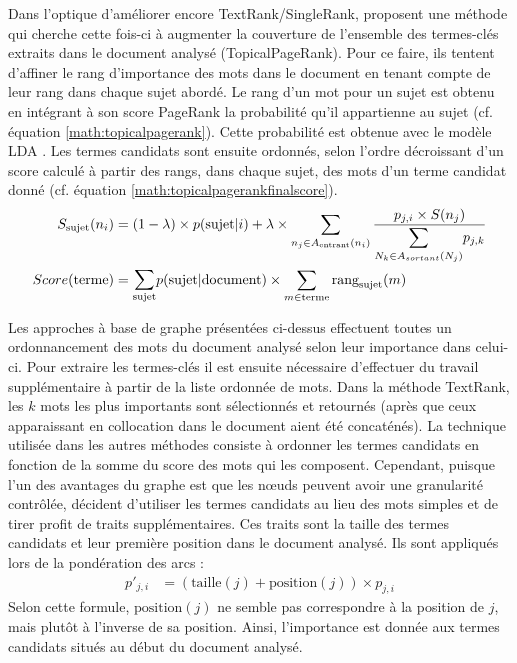           Dans l'optique d'améliorer encore TextRank/SingleRank,
          \citet{liu2010topicalpagerank} proposent une méthode qui cherche cette
          fois-ci à augmenter la couverture de l'ensemble des termes-clés extraits
          dans le document analysé (TopicalPageRank). Pour ce faire, ils tentent
          d'affiner le rang d'importance des mots dans le document en tenant compte
          de leur rang dans chaque sujet abordé. Le rang d'un mot pour un sujet est
          obtenu en intégrant à son score PageRank la probabilité qu'il appartienne
          au sujet (cf. équation \ref{math:topicalpagerank}). Cette probabilité est
          obtenue avec le modèle LDA \citep{blei2003lda}. Les termes candidats
          sont ensuite ordonnés, selon l'ordre décroissant d'un score calculé à
          partir des rangs, dans chaque sujet, des mots d'un terme candidat donné
          (cf. équation \ref{math:topicalpagerankfinalscore}).
          \begin{align}
            S_{\text{sujet}}(n_i) &= (1 - \lambda) \times p(\text{sujet} | i) + \lambda \times \sum_{n_j \in A_{\text{entrant}}(n_i)} \frac{p_{j, i} \times S(n_j)}{\mathlarger{\sum}_{N_k \in A_{sortant}(N_j)} p_{j, k}} \label{math:topicalpagerank}\\
            Score(\text{terme}) &= \mathlarger{\sum}_{\text{sujet}} p(\text{sujet} | \text{document}) \times \sum_{m \in \text{terme}} \text{rang}_{\text{sujet}}(m) \label{math:topicalpagerankfinalscore}
          \end{align}

          Les approches à base de graphe présentées ci-dessus effectuent toutes un
          ordonnancement des mots du document analysé selon leur importance dans
          celui-ci. Pour extraire les termes-clés il est ensuite nécessaire
          d'effectuer du travail supplémentaire à partir de la liste ordonnée de
          mots. Dans la méthode TextRank, les $k$ mots les plus importants sont
          sélectionnés et retournés (après que ceux apparaissant en collocation dans
          le document aient été concaténés). La technique utilisée dans les autres
          méthodes consiste à ordonner les termes candidats en fonction de la somme
          du score des mots qui les composent. Cependant, puisque l'un des avantages
          du graphe est que les n\oe{}uds peuvent avoir une granularité contrôlée,
          \citet{liang2009querylog} décident d'utiliser les termes candidats au lieu des
          mots simples et de tirer profit de traits supplémentaires. Ces traits sont
          la taille des termes candidats et leur première position dans le document
          analysé. Ils sont appliqués lors de la pondération des arcs :
          \begin{align}
            p'_{j, i} &= (\text{taille}(j) + \text{position}(j)) \times p_{j, i}
          \end{align}
          Selon cette formule, $\text{position}(j)$ ne semble pas correspondre à
          la position de $j$, mais plutôt à l'inverse de sa position. Ainsi,
          l'importance est donnée aux termes candidats situés au début du document analysé.

